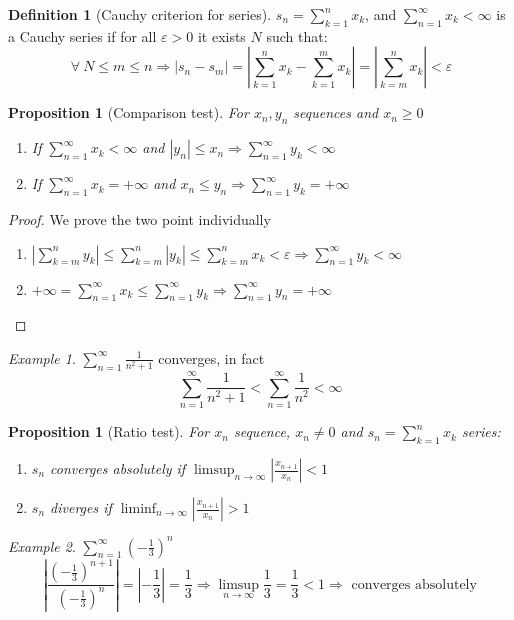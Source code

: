 \documentclass{article}
\newcommand{\DS}{\displaystyle}
\newcommand{\abs}[1]{\left|#1\right|}
\newcommand{\Ar}{\Rightarrow}
\newenvironment{enumrom}{\begin{enumerate}[label=(\roman*)]}{\end{enumerate}}
\newcommand{\fr}[2]{\frac{#1}{#2}}
\newcommand{\limsupn}{\limsup_{n \to \infty}}
\newcommand{\liminfn}{\liminf_{n \to \infty}}
\theoremstyle{definition}
\newtheorem{definition}{Definition}[section]
\theoremstyle{definition}
\theoremstyle{plain}
\theoremstyle{plain}
\theoremstyle{plain}
\theoremstyle{plain}
\newtheorem{proposition}[theorem]{Proposition}
\theoremstyle{definition}
\theoremstyle{remark}
\theoremstyle{remark}
\theoremstyle{remark}
\newtheorem{examplet}{Example}[theorem]
\theoremstyle{remark}
\newcommand{\sumn}{\sum_{k=1}^n}
\newcommand{\series}{\sum_{n=1}^\infty}
\newcommand{\seriec}{\sum_{k=m}^n}
\newcommand{\ForAll}{\ \forall \ }
\newcommand{\E}{\varepsilon}
\begin{document}
\begin{definition}[Cauchy criterion for series]
  $\DS s_n = \sumn{x_k}$, and $\DS \series{x_k} < \infty$ is a Cauchy series if for all $\E > 0$ it exists $N$ such that:
  \[
    \ForAll N \leq m \leq n \Ar \abs{s_n - s_m} =
    \abs{\sumn{x_k} - \sum_{k=1}^m x_k} = \abs{\sum_{k=m}^n x_k} < \E
  \]
\end{definition}


\begin{proposition}[Comparison test]
  For $x_n, y_n$ sequences and $x_n \geq 0$
  \begin{enumrom}
    \item If $\DS \series{x_k} < \infty$ and $\abs{y_n} \leq x_n \DS \Ar \series{y_k} < \infty$
    \item If $\DS \series{x_k} = +\infty$ and $x_n \leq y_n \DS \Ar \series{y_k} = +\infty$
  \end{enumrom}
\end{proposition}

\begin{proof}
  We prove the two point individually
  \begin{enumrom}
    \item $\DS \abs{\seriec{y_k}} \leq \seriec{\abs{y_k}} \leq \seriec{x_k} < \E \Ar \series{y_k} < \infty$
    \item $\DS +\infty = \series{x_k} \leq \series{y_k} \Ar \series{y_n} = +\infty$
  \end{enumrom}
\end{proof}

\begin{examplet}
  $\DS \series \fr{1}{n^2+1}$ converges, in fact
  \[
  \series \fr{1}{n^2+1} < \series \fr{1}{n^2} < \infty
  \]
\end{examplet}


\begin{proposition}[Ratio test]
  For $x_n$ sequence, $x_n \neq 0$ and $\DS s_n = \sumn{x_k}$ series:
  \begin{enumrom}
    \item $s_n$ converges absolutely if $\limsupn \abs{\fr{x_{n+1}}{x_n}} < 1$
    \item $s_n$ diverges if $\liminfn \abs{\fr{x_{n+1}}{x_n}} > 1$
  \end{enumrom}
\end{proposition}

\begin{examplet}
  $\DS \series\left({-\fr{1}{3}}\right)^n$
  \[
  \abs{\fr{(-\fr{1}{3})^{n+1}}{(-\fr{1}{3})^n}} = \abs{-\fr{1}{3}}
  = \fr{1}{3} \Ar \limsupn \fr{1}{3} = \fr{1}{3} < 1 \Ar
  \text{ converges absolutely}
  \]
\end{examplet}
\end{document}
